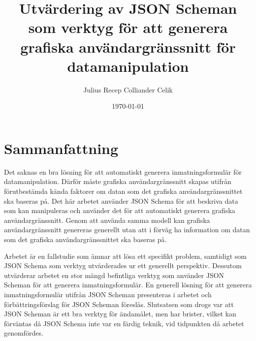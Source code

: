 \documentclass[10pt,a4paper,titlepage,twoside]{report}
\begin{document}
\title{Utvärdering av JSON Scheman som verktyg för att generera grafiska användargränssnitt för datamanipulation}
\author{Julius Recep Colliander Celik}
\date{\today}

\frontmatter


\maketitle
\cleardoublepage
\cleardoublepage

\setlength{\parindent}{0pt}

\setlength{\parskip}{\baselineskip}

\section*{Sammanfattning}
Det saknas en bra lösning för att automatiskt generera inmatningsformulär för datamanipulation. Därför måste grafiska användargränssnitt skapas utifrån förutbestämda kända faktorer om datan som det grafiska användargränssnittet ska baseras på. Det här arbetet använder JSON Schema för att beskriva data som kan manipuleras och använder det för att automatiskt generera grafiska användargränssnitt. Genom att använda samma modell kan grafiska användargränssnitt genereras generellt utan att i förväg ha information om datan som det grafiska användargränssnittet ska baseras på.

Arbetet är en fallstudie som ämnar att lösa ett specifikt problem, samtidigt som JSON Schema som verktyg utvärderades ur ett generellt perspektiv. Dessutom utvärderar arbetet en stor mängd befintliga verktyg som använder JSON Scheman för att generera inmatningsformulär. En generell lösning för att generera inmatningsformulär utifrån JSON Scheman presenteras i arbetet och förbättringsförslag för JSON Scheman föreslås. Slutsatsen som drogs var att JSON Scheman är ett bra verktyg för ändamålet, men har brister, vilket kan förväntas då JSON Schema inte var en färdig teknik, vid tidpunkten då arbetet genomfördes.

\clearpage
\end{document}
